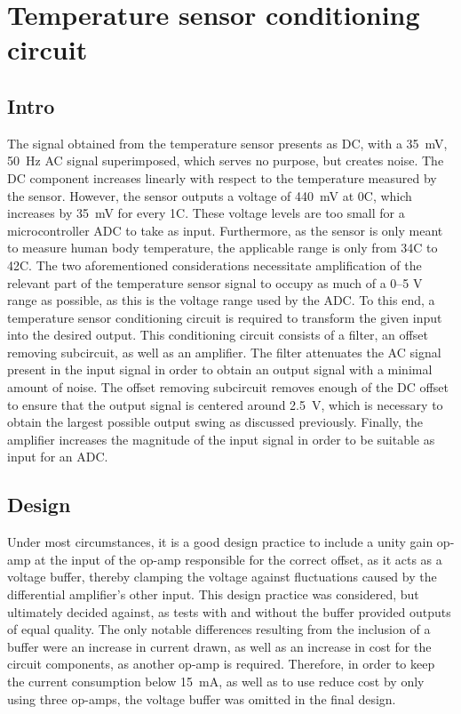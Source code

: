 \chapter{Temperature sensor conditioning circuit}\label{sec:temp_sensor}

\section{Intro} \label{sec:temp_intro}
The signal obtained from the temperature sensor presents as DC, with a \SI{35}{\milli \volt}, \SI{50}{Hz} AC signal superimposed, which serves no purpose, but creates noise. The DC component increases linearly with respect to the temperature measured by the sensor. However, the sensor outputs a voltage of \SI{440}{\milli \volt} at 0\degree C, which increases by \SI{35}{\milli \volt} for every 1\degree C. These voltage levels are too small for a microcontroller ADC to take as input. Furthermore, as the sensor is only meant to measure human body temperature, the applicable range is only from 34\degree C to 42\degree C. The two aforementioned considerations necessitate amplification of the relevant part of the temperature sensor signal to occupy as much of a \numrange{0}{5} \si{\volt} range as possible, as this is the voltage range used by the ADC.
To this end, a temperature sensor conditioning circuit is required to transform the given input into the desired output. This conditioning circuit consists of a filter, an offset removing subcircuit, as well as an amplifier. The filter attenuates the AC signal present in the input signal in order to obtain an output signal with a minimal amount of noise. The offset removing subcircuit removes enough of the DC offset to ensure that the output signal is centered around \SI{2.5}{\volt}, which is necessary to obtain the largest possible output swing as discussed previously. Finally, the amplifier increases the magnitude of the input signal in order to be suitable as input for an ADC.

\section{Design}\label{sec:temp_design}


Under most circumstances, it is a good design practice to include a unity gain op-amp at the input of the op-amp responsible for the correct offset, as it acts as a voltage buffer, thereby clamping the voltage against fluctuations caused by the differential amplifier's other input. This design practice was considered, but ultimately decided against, as tests with and without the buffer provided outputs of equal quality. The only notable differences resulting from the inclusion of a buffer were an increase in current drawn, as well as an increase in cost for the circuit components, as another op-amp is required. Therefore, in order to keep the current consumption below \SI{15}{mA}, as well as to use reduce cost by only using three op-amps, the voltage buffer was omitted in the final design.


